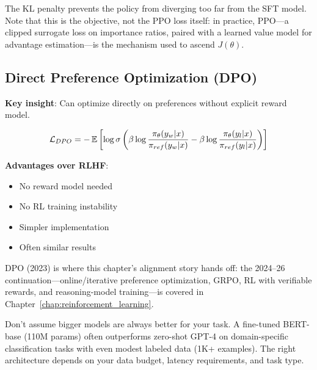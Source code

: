 The KL penalty prevents the policy from diverging too far from the SFT model. Note that this is the objective, not the PPO loss itself: in practice, PPO---a clipped surrogate loss on importance ratios, paired with a learned value model for advantage estimation---is the mechanism used to ascend $J(\theta)$.

\subsection{Direct Preference Optimization (DPO)}

\textbf{Key insight}: Can optimize directly on preferences without explicit reward model.

\begin{equation}
\mathcal{L}_{DPO} = -\operatorname{\mathbb{E}}\left[\log \sigma\left(\beta \log \frac{\pi_\theta(y_w|x)}{\pi_{ref}(y_w|x)} - \beta \log \frac{\pi_\theta(y_l|x)}{\pi_{ref}(y_l|x)}\right)\right]
\end{equation}

\textbf{Advantages over RLHF}:
\begin{itemize}
    \item No reward model needed
    \item No RL training instability
    \item Simpler implementation
    \item Often similar results
\end{itemize}

DPO (2023) is where this chapter's alignment story hands off: the 2024--26 continuation---online/iterative preference optimization, GRPO, RL with verifiable rewards, and reasoning-model training---is covered in Chapter~\ref{chap:reinforcement_learning}.

\begin{warningbox}
Don't assume bigger models are always better for your task. A fine-tuned BERT-base (110M params) often outperforms zero-shot GPT-4 on domain-specific classification tasks with even modest labeled data (1K+ examples). The right architecture depends on your data budget, latency requirements, and task type.
\end{warningbox}

